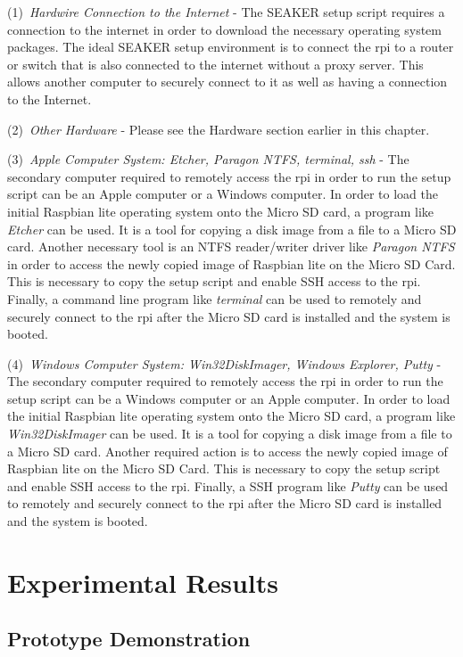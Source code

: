 \documentclass[12pt]{article}
\begin{document}
(1)~{\em Hardwire Connection to the Internet} - The SEAKER setup script
requires a connection to the internet in order to download the necessary
operating system packages.  The ideal SEAKER setup environment is to 
connect the \gls{rpi} to a router or switch that is also connected to 
the internet without a proxy server.  This allows another computer to
securely connect to it as well as having a connection to the Internet.

(2)~{\em Other Hardware} - Please see the Hardware section earlier in this
chapter.

(3)~{\em Apple Computer System: Etcher, Paragon NTFS, terminal, ssh} - The secondary
computer required to remotely access the \gls{rpi} in order to run the
setup script can be an Apple computer or a Windows computer.  In order to load
the initial Raspbian lite operating system onto the Micro SD card, a program like
{\em Etcher} can be used.  It is a tool for copying a disk image from a file to a 
Micro SD card.  Another necessary tool is an NTFS reader/writer driver like {\em Paragon
NTFS} in order to access the newly copied image of Raspbian lite on the Micro SD Card.
This is necessary to copy the setup script and enable SSH access to the \gls{rpi}.
Finally, a command line program like {\em terminal} can be used to remotely and
securely connect to the \gls{rpi} after the Micro SD card is installed and the 
system is booted.

(4)~{\em Windows Computer System: Win32DiskImager, Windows Explorer, Putty} - 
The secondary
computer required to remotely access the \gls{rpi} in order to run the
setup script can be a Windows computer or an Apple computer.  In order to load
the initial Raspbian lite operating system onto the Micro SD card, a program like
{\em Win32DiskImager} can be used.  It is a tool for copying a disk image from a file to a 
Micro SD card.  Another required action is to access the newly copied image of
Raspbian lite on the Micro SD Card. This is necessary to copy the setup script
and enable SSH access to the \gls{rpi}.
Finally, a SSH program like {\em Putty} can be used to remotely and
securely connect to the \gls{rpi} after the Micro SD card is installed and the 
system is booted.


\section{Experimental Results}
\label{sect-experimentalResults}

\subsection{Prototype Demonstration}
\end{document}
